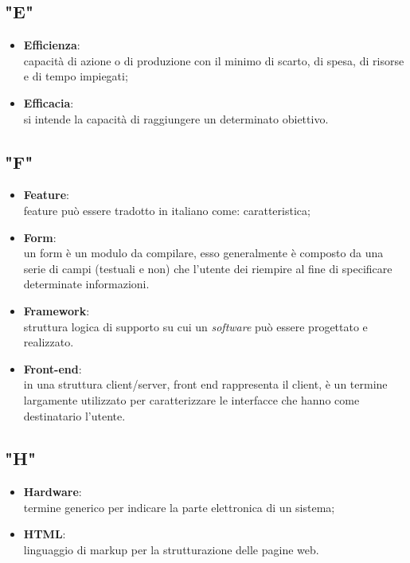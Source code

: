 \subsection*{"E"}
\begin{itemize}
\itemsep2em
\item \textbf{Efficienza}:\\ capacità di azione o di produzione con il minimo di scarto, di spesa, di risorse e di tempo impiegati; 
\item \textbf{Efficacia}:\\ si intende la capacità di raggiungere un determinato obiettivo.
\end{itemize}

\subsection*{"F"}
\begin{itemize}
\itemsep2em
\item \textbf{Feature}:\\ feature può essere tradotto in italiano come: caratteristica;
\item \textbf{Form}:\\ un form è un modulo da compilare, esso generalmente è composto da una serie di campi (testuali e non) che l'utente dei riempire al fine di specificare determinate informazioni.
\item \textbf{Framework}:\\ struttura logica di supporto su cui un \textit{software} può essere progettato e realizzato.
\item \textbf{Front-end}:\\ in una struttura client/server, front end rappresenta il client, è un termine largamente utilizzato per caratterizzare le interfacce che hanno come destinatario l'utente.
\end{itemize}

\subsection*{"H"}
\begin{itemize}
\itemsep2em
\item \textbf{Hardware}:\\ termine generico per indicare la parte elettronica di un sistema;
\item \textbf{HTML}:\\ linguaggio di markup per la strutturazione delle pagine web.
\end{itemize}

